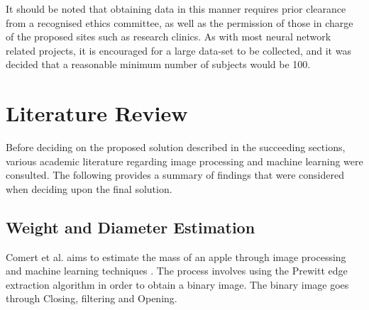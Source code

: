 It should be noted that obtaining data in this manner requires prior clearance from a recognised ethics committee, as well as the permission of those in charge of the proposed sites such as research clinics.
As with most neural network related projects, it is encouraged for a large data-set to be collected, and it was decided that a reasonable minimum number of subjects would be 100.
\section{Literature Review}
Before deciding on the proposed solution described in the succeeding sections, various academic literature regarding image processing and machine learning were consulted.
The following provides a summary of findings that were considered when deciding upon the final solution.

\subsection{Weight and Diameter Estimation}
Comert et al. aims to estimate the mass of an apple through image processing and machine learning techniques \cite{comert}.
The process involves using the Prewitt edge extraction algorithm in order to obtain a binary image.
The binary image goes through Closing, filtering and Opening.

